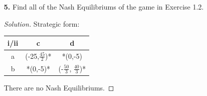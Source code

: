\documentclass[ 12pt ]{article}
\begin{document}
\begin{enumerate}
\begin{enumerate}
			\item[\textbf{5.}] Find all of the Nash Equilibriums of the game in Exercise 1.2.
				\begin{proof}[Solution]
					Strategic form:
					\begin{center}
						\begin{tabular}{|c|c|c|}
							\hline
							i/ii   & c & d \\
							\hline
							a & (-25,$\frac{45}{2}$)* & *(0,-5) \\
							b & *(0,-5)* & (-$\frac{50}{3}$, $\frac{40}{3}$)* \\
							\hline
						\end{tabular}
					\end{center}
					There are no Nash Equilibriums.
				\end{proof}
		\end{enumerate}
\end{enumerate}
\end{document}
